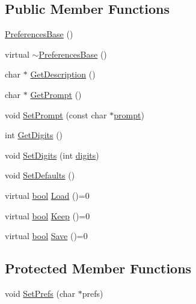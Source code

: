 \subsection*{Public Member Functions}
\begin{DoxyCompactItemize}
\item 
\hyperlink{classPreferencesBase_a24ab9b2b7d30fbe0a7b3979c0191c783}{Preferences\+Base} ()
\item 
virtual \hyperlink{classPreferencesBase_a7fc312a6820adcd1befcd386ca7f97ad}{$\sim$\+Preferences\+Base} ()
\item 
char $\ast$ \hyperlink{classPreferencesBase_a9452038c67c6592334b6f3908c86833a}{Get\+Description} ()
\item 
char $\ast$ \hyperlink{classPreferencesBase_af6a5391be98aa10d191eed80d683723d}{Get\+Prompt} ()
\item 
void \hyperlink{classPreferencesBase_a84ef7562c15ce4921ea8821e6301d302}{Set\+Prompt} (const char $\ast$\hyperlink{classPreferencesBase_a88a6af58103e0498c366d61a628312e0}{prompt})
\item 
int \hyperlink{classPreferencesBase_a8d693cb289d1f5282f13c0cfb698b8cc}{Get\+Digits} ()
\item 
void \hyperlink{classPreferencesBase_ac4bf26900de7e3aeb3af73f280781e4c}{Set\+Digits} (int \hyperlink{classPreferencesBase_add3d3cf98f920e03e425f11dabb6f984}{digits})
\item 
void \hyperlink{classPreferencesBase_a0b782da503c15f8f79d6ee99cb684fff}{Set\+Defaults} ()
\item 
virtual \hyperlink{platform_8h_a1062901a7428fdd9c7f180f5e01ea056}{bool} \hyperlink{classPreferencesBase_ab4e17e21f4377c44fa0ba16a0868a206}{Load} ()=0
\item 
virtual \hyperlink{platform_8h_a1062901a7428fdd9c7f180f5e01ea056}{bool} \hyperlink{classPreferencesBase_a83f5750e2780a0bf03cb7a394230637a}{Keep} ()=0
\item 
virtual \hyperlink{platform_8h_a1062901a7428fdd9c7f180f5e01ea056}{bool} \hyperlink{classPreferencesBase_af0c96d85f242caead85d92d2c68fb30b}{Save} ()=0
\end{DoxyCompactItemize}
\subsection*{Protected Member Functions}
\begin{DoxyCompactItemize}
\item 
void \hyperlink{classPreferencesBase_a90dcd05552f94429b05df661eb72b5e2}{Set\+Prefs} (char $\ast$prefs)
\end{DoxyCompactItemize}

